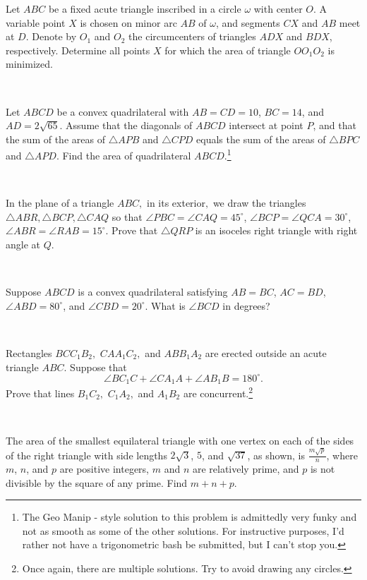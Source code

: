 \documentclass[mast]{lucky}
\begin{document}
\begin{prob}[USAMO 2020/1]{9}
Let $ABC$ be a fixed acute triangle inscribed in a circle $\omega$ with center $O$. A variable point $X$ is chosen on minor arc $AB$ of $\omega$, and segments $CX$ and $AB$ meet at $D$. Denote by $O_1$ and $O_2$ the circumcenters of triangles $ADX$ and $BDX$, respectively. Determine all points $X$ for which the area of triangle $OO_1O_2$ is minimized.
\end{prob}\\
\begin{prob}[AIME II 2018/12]{9}
Let $ABCD$ be a convex quadrilateral with $AB=CD=10$, $BC=14$, and $AD=2\sqrt{65}$. Assume that the diagonals of $ABCD$ intersect at point $P$, and that the sum of the areas of $\triangle APB$ and $\triangle CPD$ equals the sum of the areas of $\triangle BPC$ and $\triangle APD$. Find the area of quadrilateral $ABCD$.\footnote{The Geo Manip - style solution to this problem is admittedly very funky and not as smooth as some of the other solutions. For instructive purposes, I'd rather not have a trigonometric bash be submitted, but I can't stop you.}
\end{prob}\\
\begin{prob}[IMO 1975/3]{9}
In the plane of a triangle $ABC,$ in its exterior$,$ we draw the triangles $\triangle ABR, \triangle BCP, \triangle CAQ$ so that $\angle PBC = \angle CAQ = 45^{\circ}$, $\angle BCP = \angle QCA = 30^{\circ}$, $\angle ABR = \angle RAB = 15^{\circ}$.
Prove that $\triangle QRP$ is an isoceles right triangle with right angle at $Q$.
\end{prob}\\
\begin{req}{13}
Suppose $ABCD$ is a convex quadrilateral satisfying $AB=BC$, $AC=BD$, $\angle ABD = 80^\circ$, and $\angle CBD = 20^\circ$. What is $\angle BCD$ in degrees?
\end{req}\\
\begin{prob}[USAMO 2021/1]{13}
Rectangles $BCC_1B_2,$ $CAA_1C_2,$ and $ABB_1A_2$ are erected outside an acute triangle $ABC.$ Suppose that\[\angle BC_1C+\angle CA_1A+\angle AB_1B=180^{\circ}.\]Prove that lines $B_1C_2,$ $C_1A_2,$ and $A_1B_2$ are concurrent.\footnote{Once again, there are multiple solutions. Try to avoid drawing any circles.}
\end{prob}\\
\begin{prob}[AIME I 2017/15]{13}
The area of the smallest equilateral triangle with one vertex on each of the sides of the right triangle with side lengths $2\sqrt3$, $5$, and $\sqrt{37}$, as shown, is $\tfrac{m\sqrt{p}}{n}$, where $m$, $n$, and $p$ are positive integers, $m$ and $n$ are relatively prime, and $p$ is not divisible by the square of any prime. Find $m+n+p$.
\end{prob}
\end{document}
